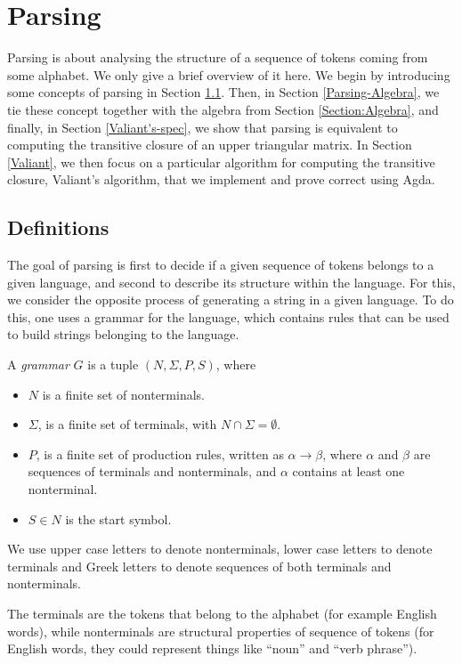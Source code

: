 \newcommand{\productions}{P}
\newcommand{\nonterminals}{N}
\newcommand{\terminals}{\Sigma}
\newcommand{\startsymbol}{S}
\newcommand{\grammar}{(\nonterminals, \terminals, \productions, \startsymbol)}
\chapter{Parsing}
\label{Parsing}
Parsing is about analysing the structure of a sequence of tokens coming from some alphabet. We only give a brief overview of it here.
We begin by introducing some concepts of parsing in Section \ref{Parsing-Defs}. Then, in Section \ref{Parsing-Algebra}, we tie these concept together with the algebra from Section \ref{Section:Algebra}, and finally, in Section \ref{Valiant's-spec}, we show that parsing is equivalent to computing the transitive closure of an upper triangular matrix.
In Section \ref{Valiant}, we then focus on a particular algorithm for computing the transitive closure, Valiant's algorithm, that we implement and prove correct using Agda.

\section{Definitions}
\label{Parsing-Defs}
The goal of parsing is first to decide if a given sequence of tokens belongs to a given language, and second to describe its structure within the language.
For this, we consider the opposite process of generating a string in a given language. To do this, one uses a grammar for the language, which contains rules that can be used to build strings belonging to the language. %
\begin{Definition}
  A \emph{grammar} $G$ is a tuple $\grammar$, where 
  \begin{itemize}
  \item $\nonterminals$ is a finite set of nonterminals.
  \item $\terminals$, is a finite set of terminals, with $\nonterminals \cap \terminals = \emptyset$.
  \item $\productions$, is a finite set of production rules, written as $\alpha \to \beta$, where $\alpha$ and $\beta$ are sequences of terminals and nonterminals, and $\alpha$ contains at least one nonterminal.
  \item $\startsymbol \in \nonterminals$ is the start symbol.
  \end{itemize}
  We use upper case letters to denote nonterminals, lower case letters to denote terminals and Greek letters to denote sequences of both terminals and nonterminals.
\end{Definition}
The terminals are the tokens that belong to the alphabet (for example English words), while nonterminals are structural properties of sequence of tokens (for English words, they could represent things like ``noun'' and ``verb phrase'').

